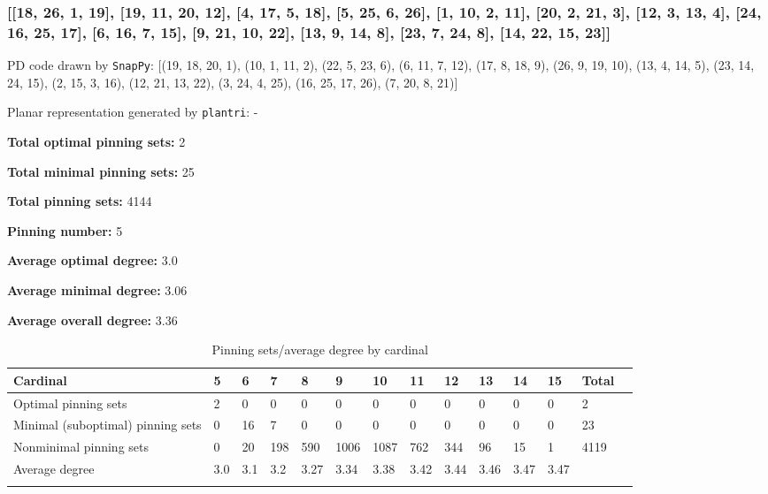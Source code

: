 \documentclass{article}%
\begin{document}
\newpage

\subsubsection{[[18, 26, 1, 19], [19, 11, 20, 12], [4, 17, 5, 18], [5, 25, 6, 26], [1, 10, 2, 11], [20, 2, 21, 3], [12, 3, 13, 4], [24, 16, 25, 17], [6, 16, 7, 15], [9, 21, 10, 22], [13, 9, 14, 8], [23, 7, 24, 8], [14, 22, 15, 23]]}

{\small\noindent PD code drawn by \texttt{SnapPy}: [(19, 18, 20, 1), (10, 1, 11, 2), (22, 5, 23, 6), (6, 11, 7, 12), (17, 8, 18, 9), (26, 9, 19, 10), (13, 4, 14, 5), (23, 14, 24, 15), (2, 15, 3, 16), (12, 21, 13, 22), (3, 24, 4, 25), (16, 25, 17, 26), (7, 20, 8, 21)]}

{\small\noindent Planar representation generated by \texttt{plantri}: -}

\begin{multicols}{2}
{\normalsize \noindent\textbf{Total optimal pinning sets:} 2

\noindent\textbf{Total minimal pinning sets:} 25

\noindent\textbf{Total pinning sets:} 4144

\noindent\textbf{Pinning number:} 5

}
\columnbreak

{\normalsize \noindent\textbf{Average optimal degree:} 3.0

\noindent\textbf{Average minimal degree:} 3.06

\noindent\textbf{Average overall degree:} 3.36

}
\end{multicols}

\begin{table}[ht]
	\caption{Pinning sets/average degree by cardinal}
	\centering
	\renewcommand{\arraystretch}{1.5}
	\begin{tabularx}{\textwidth}{lXXXXXXXXXXXXX}
		\toprule
			Cardinal & 5 & 6 & 7 & 8 & 9 & 10 & 11 & 12 & 13 & 14 & 15 & Total\\
			\hline
			Optimal pinning sets & 2 & 0 & 0 & 0 & 0 & 0 & 0 & 0 & 0 & 0 & 0 & 2 \\
			Minimal (suboptimal) pinning sets & 0 & 16 & 7 & 0 & 0 & 0 & 0 & 0 & 0 & 0 & 0 & 23 \\
			Nonminimal pinning sets & 0 & 20 & 198 & 590 & 1006 & 1087 & 762 & 344 & 96 & 15 & 1 & 4119 \\
			Average degree & 3.0 & 3.1 & 3.2 & 3.27 & 3.34 & 3.38 & 3.42 & 3.44 & 3.46 & 3.47 & 3.47 &  \\
		\bottomrule \\ 
	\end{tabularx}
\end{table}
\end{document}
